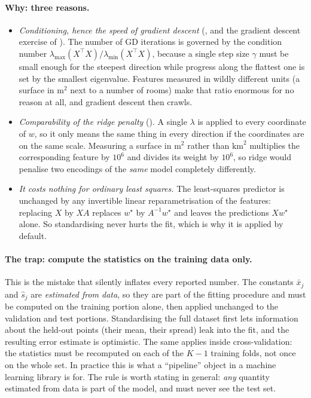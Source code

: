 \paragraph{Why: three reasons.}
\begin{itemize}
    \item \emph{Conditioning, hence the speed of gradient descent}
    (, and the gradient descent exercise of ). The number of GD iterations is governed by the condition
    number $\lambda_{\max}(X^\top X)/\lambda_{\min}(X^\top X)$, because a single step
    size $\gamma$ must be small enough for the steepest direction while progress along
    the flattest one is set by the smallest eigenvalue. Features measured in wildly
    different units (a surface in $\text{m}^2$ next to a number of rooms) make that
    ratio enormous for no reason at all, and gradient descent then crawls.
    \item \emph{Comparability of the ridge penalty} (). A single
    $\lambda$ is applied to every coordinate of $w$, so it only means the same thing in
    every direction if the coordinates are on the same scale. Measuring a surface in
    $\text{m}^2$ rather than $\text{km}^2$ multiplies the corresponding feature by
    $10^6$ and divides its weight by $10^6$, so ridge would penalise two encodings of
    the \emph{same} model completely differently.
    \item \emph{It costs nothing for ordinary least squares.} The least-squares
    predictor is unchanged by any invertible linear reparametrisation of the features:
    replacing $X$ by $XA$ replaces $w^\star$ by $A^{-1}w^\star$ and leaves the
    predictions $Xw^\star$ alone. So standardising never hurts the fit, which is why it
    is applied by default.
\end{itemize}

\paragraph{The trap: compute the statistics on the training data only.}
This is the mistake that silently inflates every reported number. The constants
$\bar x_j$ and $\hat s_j$ are \emph{estimated from data}, so they are part of the
fitting procedure and must be computed on the training portion alone, then applied
unchanged to the validation and test portions. Standardising the full dataset first
lets information about the held-out points (their mean, their spread) leak into the
fit, and the resulting error estimate is optimistic. The same applies inside
cross-validation: the statistics must be recomputed on each of the $K-1$ training
folds, not once on the whole set. In practice this is what a ``pipeline'' object in a
machine learning library is for. The rule is worth stating in general: \emph{any}
quantity estimated from data is part of the model, and must never see the test set.



